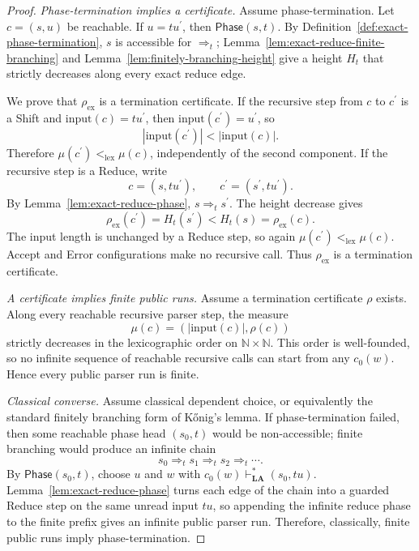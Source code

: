 \documentclass[11pt,a4paper]{article}
\theoremstyle{prettyplain}
\theoremstyle{prettydef}
\newcommand{\Look}{\mathbf{LA}}
\begin{document}
\begin{proof}
\emph{Phase-termination implies a certificate.}
Assume phase-termination.  Let \(c=(s,u)\) be reachable.  If
\(u=t u^\prime\), then \(\mathsf{Phase}(s,t)\).  By
Definition~\ref{def:exact-phase-termination}, \(s\) is accessible for
\(\Rightarrow_t\); Lemma~\ref{lem:exact-reduce-finite-branching} and
Lemma~\ref{lem:finitely-branching-height} give a height \(H_t\) that strictly
decreases along every exact reduce edge.

We prove that \(\rho_{\mathrm{ex}}\) is a termination certificate.  If the
recursive step from \(c\) to \(c^\prime\) is a Shift and
\(\mathrm{input}(c)=t u^\prime\), then \(\mathrm{input}(c^\prime)=u^\prime\), so
\[
|\mathrm{input}(c^\prime)|<|\mathrm{input}(c)|.
\]
Therefore \(\mu(c^\prime)<_{\mathrm{lex}}\mu(c)\), independently of the second
component.  If the recursive step is a Reduce, write
\[
c=(s,t u^\prime),
\qquad
c^\prime=(s^\prime,t u^\prime).
\]
By Lemma~\ref{lem:exact-reduce-phase}, \(s\Rightarrow_t s^\prime\).  The height
decrease gives
\[
\rho_{\mathrm{ex}}(c^\prime)=H_t(s^\prime)<H_t(s)=\rho_{\mathrm{ex}}(c).
\]
The input length is unchanged by a Reduce step, so again
\(\mu(c^\prime)<_{\mathrm{lex}}\mu(c)\).  Accept and Error configurations make no
recursive call.  Thus \(\rho_{\mathrm{ex}}\) is a termination certificate.

\emph{A certificate implies finite public runs.}
Assume a termination certificate \(\rho\) exists.  Along every reachable
recursive parser step, the measure
\[
\mu(c)=(|\mathrm{input}(c)|,\rho(c))
\]
strictly decreases in the lexicographic order on \(\mathbb N\times\mathbb N\).
This order is well-founded, so no infinite sequence of reachable recursive calls
can start from any \(c_0(w)\).  Hence every public parser run is finite.

\emph{Classical converse.}
Assume classical dependent choice, or equivalently the standard finitely
branching form of K\H{o}nig's lemma.  If phase-termination failed, then some
reachable phase head \((s_0,t)\) would be non-accessible; finite branching would
produce an infinite chain
\[
s_0\Rightarrow_t s_1\Rightarrow_t s_2\Rightarrow_t\cdots .
\]
By \(\mathsf{Phase}(s_0,t)\), choose \(u\) and \(w\) with
\(c_0(w)\vdash_{\Look}^{*}(s_0,t u)\).  Lemma~\ref{lem:exact-reduce-phase} turns
each edge of the chain into a guarded Reduce step on the same unread input
\(t u\), so appending the infinite reduce phase to the finite prefix gives an
infinite public parser run.  Therefore, classically, finite public runs imply
phase-termination.
\end{proof}
\end{document}
